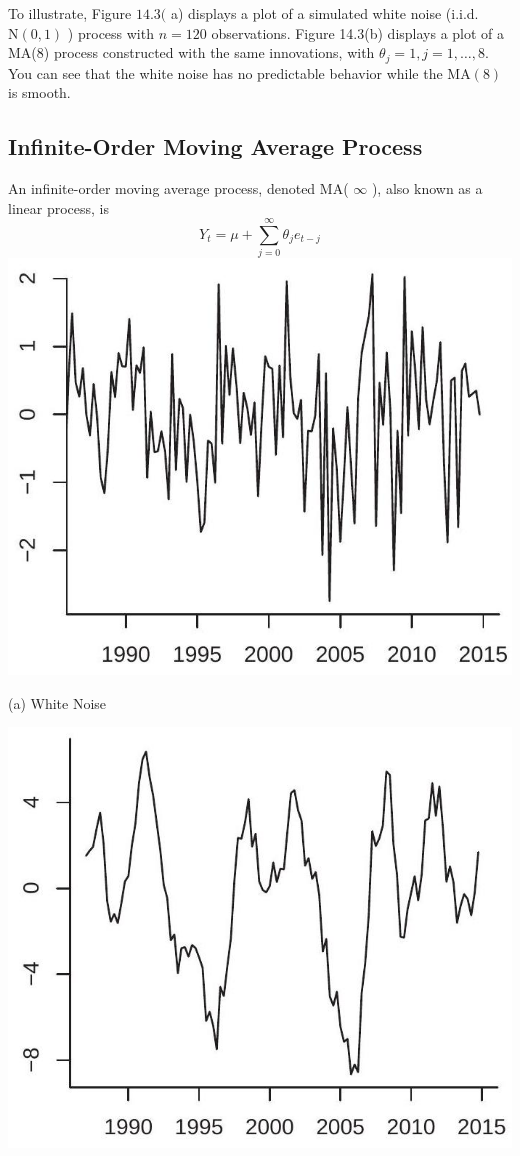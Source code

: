 \documentclass[10pt]{article}
\begin{document}
To illustrate, Figure $14.3($ a) displays a plot of a simulated white noise (i.i.d. $\mathrm{N}(0,1)$ ) process with $n=120$ observations. Figure 14.3(b) displays a plot of a MA(8) process constructed with the same innovations, with $\theta_{j}=1, j=1, \ldots, 8$. You can see that the white noise has no predictable behavior while the $\mathrm{MA}(8)$ is smooth.

\subsection{Infinite-Order Moving Average Process}
An infinite-order moving average process, denoted MA( $\infty$ ), also known as a linear process, is
$$
Y_{t}=\mu+\sum_{j=0}^{\infty} \theta_{j} e_{t-j}
$$
\includegraphics[max width=\textwidth]{2022_10_23_6047885e7d154c9f28afg-23}

(a) White Noise

\includegraphics[max width=\textwidth]{2022_10_23_6047885e7d154c9f28afg-23(1)}
\end{document}
